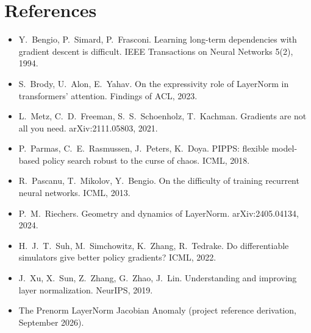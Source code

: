 \documentclass[11pt]{article}
\theoremstyle{plainnote}
\begin{document}
\section*{References}
\begin{itemize}
\setlength{\itemsep}{0.1em}
\item Y.~Bengio, P.~Simard, P.~Frasconi. Learning long-term dependencies with gradient descent is difficult. IEEE Transactions on Neural Networks 5(2), 1994.
\item S.~Brody, U.~Alon, E.~Yahav. On the expressivity role of LayerNorm in transformers' attention. Findings of ACL, 2023.
\item L.~Metz, C.~D.~Freeman, S.~S.~Schoenholz, T.~Kachman. Gradients are not all you need. arXiv:2111.05803, 2021.
\item P.~Parmas, C.~E.~Rasmussen, J.~Peters, K.~Doya. PIPPS: flexible model-based policy search robust to the curse of chaos. ICML, 2018.
\item R.~Pascanu, T.~Mikolov, Y.~Bengio. On the difficulty of training recurrent neural networks. ICML, 2013.
\item P.~M.~Riechers. Geometry and dynamics of LayerNorm. arXiv:2405.04134, 2024.
\item H.~J.~T.~Suh, M.~Simchowitz, K.~Zhang, R.~Tedrake. Do differentiable simulators give better policy gradients? ICML, 2022.
\item J.~Xu, X.~Sun, Z.~Zhang, G.~Zhao, J.~Lin. Understanding and improving layer normalization. NeurIPS, 2019.
\item The Prenorm LayerNorm Jacobian Anomaly (project reference derivation, September 2026).
\end{itemize}
\end{document}

